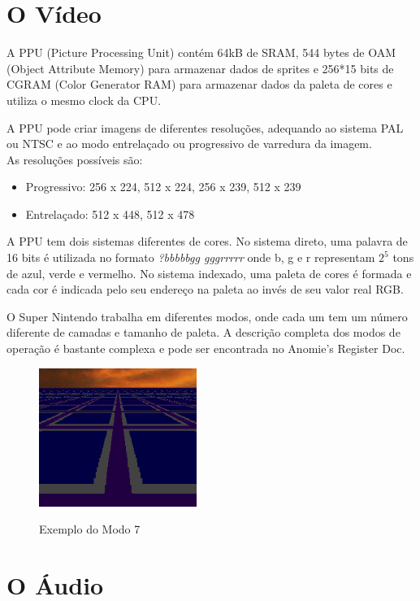 \documentclass[paper=a4, fontsize=11pt]{scrartcl}	%
\numberwithin{equation}{section}															%
\numberwithin{figure}{section}																%
\numberwithin{table}{section}																%
\begin{document}
\section{O Vídeo}

A PPU (Picture Processing Unit) contém 64kB de SRAM, 544 bytes de OAM (Object Attribute Memory) para armazenar dados de sprites e 256*15 bits de CGRAM (Color Generator RAM) para armazenar dados da paleta de cores e utiliza o mesmo clock da CPU.\cite{AnomieRegDoc}

A PPU pode criar imagens de diferentes resoluções, adequando ao sistema PAL ou NTSC e ao modo entrelaçado ou progressivo de varredura da imagem.\\
As resoluções possíveis são:
\begin{itemize}
  \item{Progressivo: 256 x 224, 512 x 224, 256 x 239, 512 x 239}
  \item{Entrelaçado: 512 x 448, 512 x 478}
\end{itemize}
A PPU tem dois sistemas diferentes de cores. No sistema direto, uma palavra de 16 bits é utilizada no formato \textit{?bbbbbgg gggrrrrr} onde b, g e r representam $2^{5}$ tons de azul, verde e vermelho. No sistema indexado, uma paleta de cores é formada e cada cor é indicada pelo seu endereço na paleta ao invés de seu valor real RGB.

O Super Nintendo trabalha em diferentes modos, onde cada um tem um número diferente de camadas e tamanho de paleta. A descrição completa dos modos de operação é bastante complexa e pode ser encontrada no Anomie’s Register Doc\cite{AnomieRegDoc}.

\begin{figure}
  \begin{center}
  	\centering
    \includegraphics[height=4.5cm, width=\textwidth, keepaspectratio]{img/Mode_7.png}
    \label{fig:}
    \caption{Exemplo do Modo 7\cite{fonte_modo_7}}   
  \end{center}
\end{figure}

\section{O Áudio}
\end{document}
